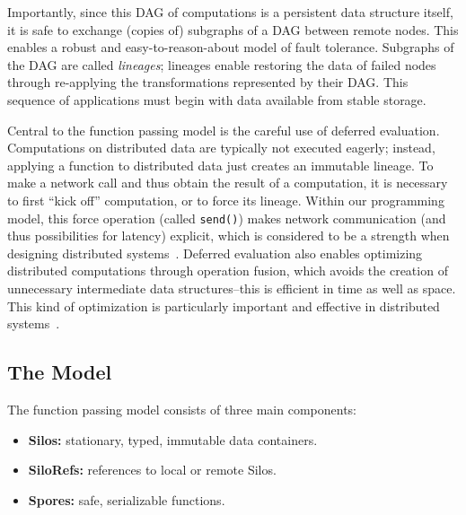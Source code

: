 \documentclass[10pt]{sigplanconf}
\theoremstyle{definition}
\theoremstyle{definition}
\begin{document}
Importantly, since this DAG of computations is a persistent data structure
itself, it is safe to exchange (copies of) subgraphs of a DAG between remote
nodes. This enables a robust and easy-to-reason-about model of fault tolerance.
Subgraphs of the DAG are called \textit{lineages}; lineages enable restoring the data
of failed nodes through re-applying the transformations represented by their
DAG. This sequence of applications must begin with data available from stable
storage.

Central to the function passing model is the careful use of deferred evaluation.
Computations on distributed data are typically not executed eagerly; instead,
applying a function to distributed data just creates an immutable lineage. To
make a network call and thus obtain the result of a computation, it is necessary
to first ``kick off'' computation, or to force its lineage. Within our
programming model, this force operation (called \verb|send()|) makes network
communication (and thus possibilities for latency) explicit, which is considered
to be a strength when designing distributed systems~\cite{ANoteDistComp}.
Deferred evaluation also enables optimizing distributed computations through
operation fusion, which avoids the creation of unnecessary intermediate data
structures--this is efficient in time as well as space. This kind of
optimization is particularly important and effective in distributed
systems~\cite{FlumeJava}.


\subsection{The Model}

The function passing model consists of three main components:
\begin{itemize}[noitemsep]
  \item {\bf Silos:} stationary, typed, immutable data containers.
  \item {\bf SiloRefs:} references to local or remote Silos.
  \item {\bf Spores:} safe, serializable functions.
\end{itemize}
\vspace{1mm}
\end{document}
